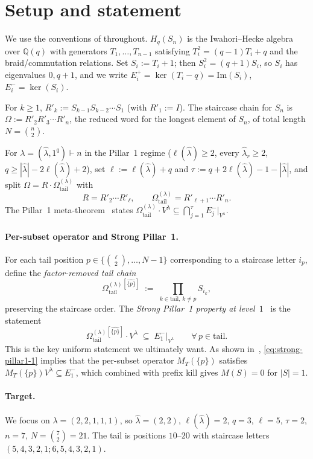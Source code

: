 \documentclass[11pt]{article}
\theoremstyle{definition}
\newcommand{\Hq}{H_q}
\newcommand{\Sn}{S_n}
\newcommand{\Vlam}{V^\lambda}
\newcommand{\Om}{\Omega}
\newcommand{\Omtail}{\Omega^{(\lambda)}_{\mathrm{tail}}}
\newcommand{\hatl}{\widehat\lambda}
\newcommand{\elh}{\ell(\hatl)}
\newcommand{\Rp}{R'}
\newcommand{\Eplus}[1]{E^+_{#1}}
\newcommand{\Eminus}[1]{E^-_{#1}}
\newcommand{\Qsym}{\mathbb{Q}(q)}
\begin{document}
\section{Setup and statement}

We use the conventions of \cite{strong, persubset} throughout. $\Hq(\Sn)$ is the
Iwahori--Hecke algebra over $\Qsym$ with generators $T_1,\ldots,T_{n-1}$ satisfying
$T_i^2 = (q-1)T_i + q$ and the braid/commutation relations. Set $S_i := T_i + 1$;
then $S_i^2 = (q+1)S_i$, so $S_i$ has eigenvalues $0, q+1$, and we write
$\Eplus i = \ker(T_i - q) = \mathrm{Im}(S_i)$, $\Eminus i = \ker(S_i)$.

For $k \ge 1$, $\Rp_k := S_{k-1} S_{k-2} \cdots S_1$ (with $\Rp_1 := I$).
The staircase chain for $\Sn$ is $\Om := \Rp_2 \Rp_3 \cdots \Rp_n$, the reduced word
for the longest element of $\Sn$, of total length $N = \binom{n}{2}$.

For $\lambda = (\hatl, 1^q) \vdash n$ in the Pillar~1 regime
($\elh \ge 2$, every $\hatl_r \ge 2$, $q \ge |\hatl| - 2\elh + 2$), set
$\ell := \elh + q$ and $\tau := q + 2\elh - 1 - |\hatl|$, and split
$\Om = R \cdot \Omtail$ with
\[
   R = \Rp_2 \cdots \Rp_\ell, \qquad \Omtail = \Rp_{\ell+1} \cdots \Rp_n.
\]
The Pillar~1 meta-theorem~\cite{pillar1} states
$\Omtail \cdot \Vlam \subseteq \bigcap_{j=1}^\tau \Eminus j|_{\Vlam}$.

\paragraph{Per-subset operator and Strong Pillar~1.}
For each tail position $p \in \{\binom{\ell}{2}, \ldots, N-1\}$ corresponding to a
staircase letter $i_p$, define the \emph{factor-removed tail chain}
\[
   \Omtail^{[\widehat{\{p\}}]} \;:=\; \prod_{k \in \mathrm{tail},\, k \ne p} S_{i_k},
\]
preserving the staircase order.
The \emph{Strong Pillar~1 property at level~$1$}~\cite{persubset}
is the statement
\begin{equation}\label{eq:strong-pillar1-1}
   \Omtail^{[\widehat{\{p\}}]} \cdot \Vlam \;\subseteq\;
   \Eminus 1|_{\Vlam} \qquad \forall\, p \in \mathrm{tail}.
\end{equation}
This is the key uniform statement we ultimately want. As shown
in~\cite[Thm.~\ref{thm:per-subset-from-strong}]{persubset}, \eqref{eq:strong-pillar1-1}
implies that the per-subset operator $M_T(\{p\})$ satisfies
$M_T(\{p\}) \Vlam \subseteq \Eminus 1$, which combined with prefix kill gives
$M(S) = 0$ for $|S| = 1$.

\paragraph{Target.}
We focus on $\lambda = (2,2,1,1,1)$, so $\hatl = (2,2)$, $\elh = 2$, $q = 3$,
$\ell = 5$, $\tau = 2$, $n = 7$, $N = \binom{7}{2} = 21$. The tail is positions
$10$--$20$ with staircase letters $(5,4,3,2,1; 6,5,4,3,2,1)$.
\end{document}
